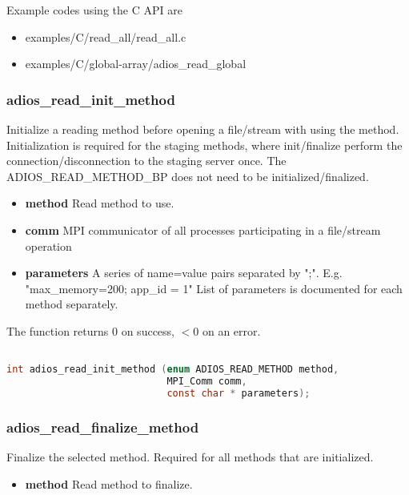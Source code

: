 Example codes using the C API are 

\begin{itemize}
\renewcommand{\labelitemi}{$-$}
\item examples/C/read\_all/read\_all.c

\item examples/C/global-array/adios\_read\_global
\end{itemize}

\subsubsection*{adios\_read\_init\_method}
Initialize a reading method before opening a file/stream with using 
the method.
Initialization is required for the staging methods, where init/finalize 
perform the connection/disconnection to the staging server once.
The ADIOS\_READ\_METHOD\_BP does not need to be initialized/finalized. 

\begin{itemize}
\item{\bf method} Read method to use.
\item{\bf comm} MPI communicator of all processes participating in a file/stream operation
\item{\bf parameters} A series of name=value pairs separated by ";".  E.g. "max\_memory=200; app\_id = 1"
List of parameters is documented for each method separately. 
\end{itemize}

The function returns 0 on success, $<0$ on an error.

\begin{lstlisting}[language=C,caption=Initialize for reading]

int adios_read_init_method (enum ADIOS_READ_METHOD method, 
                            MPI_Comm comm, 
                            const char * parameters);

\end{lstlisting}

\subsubsection*{adios\_read\_finalize\_method}

Finalize the selected method. Required for all methods that are initialized. 
\begin{itemize}
\item{\bf method} Read method to finalize. 
\end{itemize}

